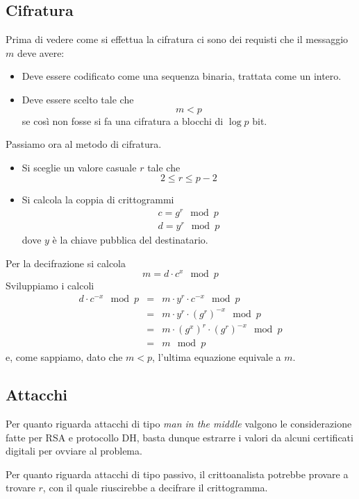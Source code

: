 \subsection{Cifratura}
Prima di vedere come si effettua la cifratura ci sono dei requisti che il messaggio $m$ deve avere:
\begin{itemize}
	\item Deve essere codificato come una sequenza binaria, trattata come un intero.
	\item Deve essere scelto tale che
	      \[ m < p \]
	      se cos\`i non fosse si fa una cifratura a blocchi di $\log p$ bit.
\end{itemize}
Passiamo ora al metodo di cifratura.
\begin{itemize}
	\item Si sceglie un valore casuale $r$ tale che
	      \[ 2 \leq r \leq p - 2 \]
	\item Si calcola la coppia di crittogrammi
	      \begin{gather*}
		      c = g^r \mod{p} \\
		      d = y^r \mod{p}
	      \end{gather*}
	      dove $y$ \`e la chiave pubblica del destinatario.
\end{itemize}
Per la decifrazione si calcola
\[ m = d \cdot c^x \mod{p} \]
Sviluppiamo i calcoli
\[
	\begin{matrix}
		d \cdot c^{-x} \mod{p} & = & m \cdot y^r \cdot c^{-x} \mod{p}         \\
		                       & = & m \cdot y^r \cdot (g^r)^{-x} \mod{p}     \\
		                       & = & m \cdot (g^x)^r \cdot (g^r)^{-x} \mod{p} \\
		                       & = & m \mod{p}
	\end{matrix}
\]
e, come sappiamo, dato che $m < p$, l'ultima equazione equivale a $m$.

\subsection{Attacchi}
Per quanto riguarda attacchi di tipo \emph{man in the middle} valgono le considerazione fatte per RSA e protocollo
DH, basta dunque estrarre i valori da alcuni certificati digitali per ovviare al problema.

Per quanto riguarda attacchi di tipo passivo, il crittoanalista potrebbe provare a trovare $r$, con il quale
riuscirebbe a decifrare il crittogramma.

